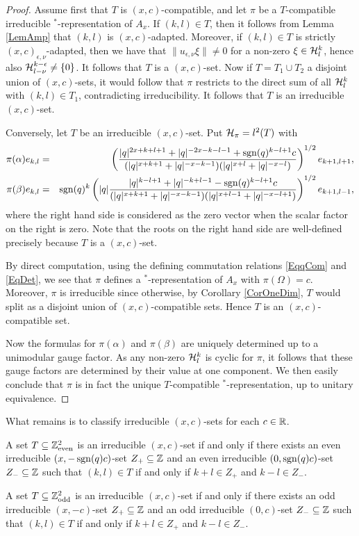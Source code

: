 \begin{proof} Assume first that $T$ is $(x,c)$-compatible, and let $\pi$ be a $T$-compatible irreducible $^*$-representation of $A_x$. If $(k,l)\in T$, then it follows from Lemma \ref{LemAmp} that $(k,l)$ is $(x,c)$-adapted. Moreover, if $(k,l)\in T$ is strictly $(x,c)_{\epsilon,\nu}$-adapted, then we have that $\|u_{\epsilon,\nu}\xi\|\neq 0$ for a non-zero $\xi\in \mathcal{H}^k_l$, hence also $\mathcal{H}^{k-\epsilon}_{l-\nu}\neq \{0\}$. It follows that $T$ is a $(x,c)$-set. Now if $T=T_1\cup T_2$ a disjoint union of $(x,c)$-sets, it would follow that $\pi$ restricts to the direct sum of all $\mathcal{H}^k_l$ with $(k,l)\in T_1$, contradicting irreducibility. It follows that $T$ is an irreducible $(x,c)$-set.

Conversely, let $T$ be an irreducible $(x,c)$-set. Put $\mathcal{H}_{\pi} = l^2(T)$ with \begin{eqnarray*} \pi(\alpha) e_{k,l} &=&  \left(\frac{|q|^{2x+k+l+1}+|q|^{-2x-k-l-1}+\operatorname{\mathrm{sgn}}(q)^{k-l+1}c}{(|q|^{x+k+1}+|q|^{-x-k-1})(|q|^{x+l}+|q|^{-x-l})}\right)^{1/2}e_{k+1,l+1},\\ \pi(\beta) e_{k,l} &=& \operatorname{\mathrm{sgn}}(q)^{k}\left(|q|\frac{|q|^{k-l+1}+|q|^{-k+l-1}-\operatorname{\mathrm{sgn}}(q)^{k-l+1}c}{(|q|^{x+k+1}+|q|^{-x-k-1})(|q|^{x+l-1}+|q|^{-x-l+1})}\right)^{1/2} e_{k+1,l-1},\end{eqnarray*} where the right hand side is considered as the zero vector when the scalar factor on the right is zero. Note that the roots on the right hand side are well-defined precisely because $T$ is a $(x,c)$-set. 

By direct computation, using the defining commutation relations \eqref{EqqCom} and \eqref{EqDet}, we see that $\pi$ defines a $^*$-representation of $A_x$ with $\pi(\Omega) =c$. Moreover, $\pi$ is irreducible since otherwise, by Corollary \ref{CorOneDim}, $T$ would split as a disjoint union of $(x,c)$-compatible sets. Hence $T$ is an $(x,c)$-compatible set.

Now the formulas for $\pi(\alpha)$ and $\pi(\beta)$ are uniquely determined up to a unimodular gauge factor. As any non-zero $\mathcal{H}^{k}_l$ is cyclic for $\pi$, it follows that these gauge factors are determined by their value at one component. We then easily conclude that $\pi$ is in fact the unique $T$-compatible $^*$-representation, up to unitary equivalence.
\end{proof}

What remains is to classify irreducible $(x,c)$-sets for each $c\in \mathbb{R}$. 

\begin{Lem}\label{LemClass2D} A set $T\subseteq \mathbb{Z}^2_{\mathrm{even}}$ is an irreducible $(x,c)$-set if and only if there exists an even irreducible $(x,-\operatorname{\mathrm{sgn}}(q)c)$-set $Z_+\subseteq \mathbb{Z}$ and an even irreducible $(0,\operatorname{\mathrm{sgn}}(q)c)$-set $Z_-\subseteq \mathbb{Z}$ such that $(k,l)\in T$ if and only if $k+l\in Z_+$ and $k-l\in Z_-$.

A set $T\subseteq \mathbb{Z}^2_{\mathrm{odd}}$ is an irreducible $(x,c)$-set if and only if there exists an odd irreducible $(x,-c)$-set $Z_+\subseteq \mathbb{Z}$ and an odd irreducible $(0,c)$-set $Z_-\subseteq \mathbb{Z}$ such that $(k,l)\in T$ if and only if $k+l\in Z_+$ and $k-l\in Z_-$.
\end{Lem} 

